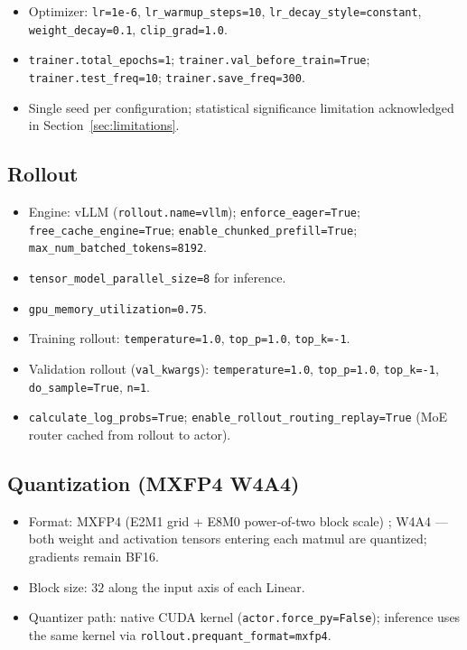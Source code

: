 \begin{itemize}
        \texttt{reward\_model.enable=False} since rewards are computed
        from the dataset's ground-truth field).
  \item Optimizer:
        \texttt{lr=1e-6},
        \texttt{lr\_warmup\_steps=10},
        \texttt{lr\_decay\_style=constant},
        \texttt{weight\_decay=0.1},
        \texttt{clip\_grad=1.0}.
  \item \texttt{trainer.total\_epochs=1};
        \texttt{trainer.val\_before\_train=True};
        \texttt{trainer.test\_freq=10};
        \texttt{trainer.save\_freq=300}.
  \item Single seed per configuration; statistical significance
        limitation acknowledged in Section~\ref{sec:limitations}.
\end{itemize}

\subsection*{Rollout}

\begin{itemize}\setlength{\itemsep}{1pt}
  \item Engine: vLLM (\texttt{rollout.name=vllm});
        \texttt{enforce\_eager=True}; \texttt{free\_cache\_engine=True};
        \texttt{enable\_chunked\_prefill=True};
        \texttt{max\_num\_batched\_tokens=8192}.
  \item \texttt{tensor\_model\_parallel\_size=8} for inference.
  \item \texttt{gpu\_memory\_utilization=0.75}.
  \item Training rollout: \texttt{temperature=1.0},
        \texttt{top\_p=1.0}, \texttt{top\_k=-1}.
  \item Validation rollout (\texttt{val\_kwargs}):
        \texttt{temperature=1.0}, \texttt{top\_p=1.0},
        \texttt{top\_k=-1}, \texttt{do\_sample=True}, \texttt{n=1}.
  \item \texttt{calculate\_log\_probs=True};
        \texttt{enable\_rollout\_routing\_replay=True} (MoE router
        cached from rollout to actor).
\end{itemize}

\subsection*{Quantization (MXFP4 W4A4)}

\begin{itemize}\setlength{\itemsep}{1pt}
  \item Format: MXFP4 (E2M1 grid + E8M0 power-of-two block scale)
        \citep{rouhani2023ocp}; W4A4 — both weight and activation
        tensors entering each matmul are quantized; gradients remain
        BF16.
  \item Block size: $32$ along the input axis of each Linear.
  \item Quantizer path: native CUDA kernel
        (\texttt{actor.force\_py=False}); inference uses the same
        kernel via \texttt{rollout.prequant\_format=mxfp4}.
\end{itemize}

